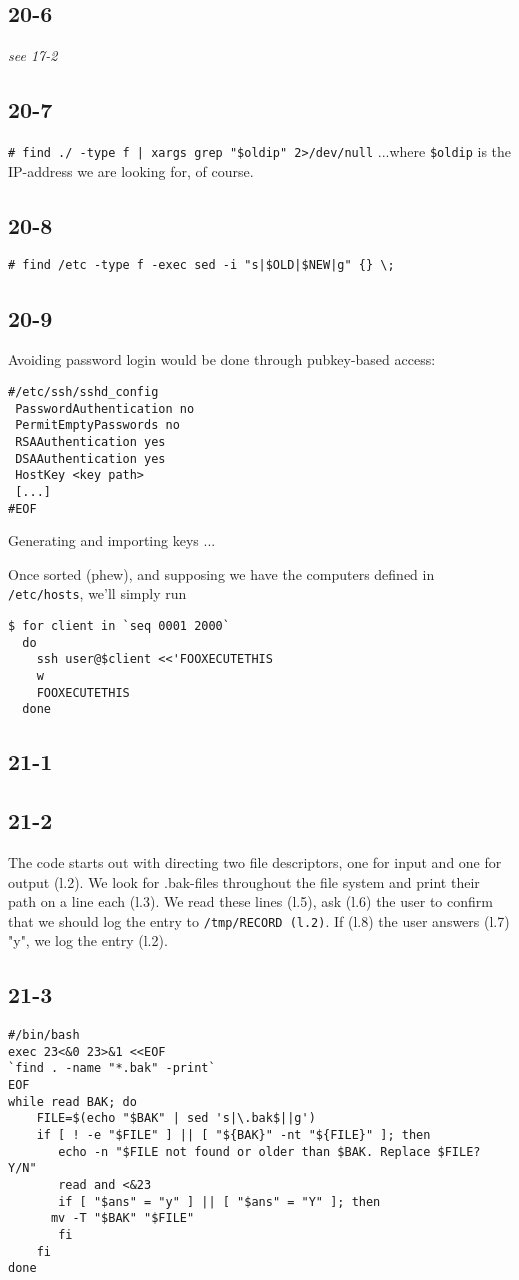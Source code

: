 \subsection{20-6}
\emph{see 17-2}

\subsection{20-7}
\verb=# find ./ -type f | xargs grep "$oldip" 2>/dev/null=
...where \verb=$oldip= is the IP-address we are looking for, of course.

\subsection{20-8}
\verb=# find /etc -type f -exec sed -i "s|$OLD|$NEW|g" {} \;=

\subsection{20-9}
Avoiding password login would be done through pubkey-based access:

\begin{verbatim}
#/etc/ssh/sshd_config
 PasswordAuthentication no
 PermitEmptyPasswords no
 RSAAuthentication yes
 DSAAuthentication yes
 HostKey <key path>
 [...]
#EOF
\end{verbatim}

Generating and importing keys ...

Once sorted (phew), and supposing we have the computers defined in \verb=/etc/hosts=,  we'll simply run

\begin{verbatim}
$ for client in `seq 0001 2000`
  do
    ssh user@$client <<'FOOXECUTETHIS
    w
    FOOXECUTETHIS
  done
\end{verbatim}
\subsection{21-1}

\subsection{21-2}
The code starts out with directing two file descriptors, one for input and one for output (l.2). We look
for .bak-files throughout the file system and print their path on a line each (l.3). We read these lines (l.5),
ask (l.6) the user to confirm that we should log the entry to \verb=/tmp/RECORD (l.2)=. If (l.8) the user answers (l.7) "y", we log the entry (l.2).

\subsection{21-3}
\begin{verbatim}
#/bin/bash
exec 23<&0 23>&1 <<EOF
`find . -name "*.bak" -print`
EOF
while read BAK; do
    FILE=$(echo "$BAK" | sed 's|\.bak$||g')
    if [ ! -e "$FILE" ] || [ "${BAK}" -nt "${FILE}" ]; then
       echo -n "$FILE not found or older than $BAK. Replace $FILE? Y/N"
       read and <&23
       if [ "$ans" = "y" ] || [ "$ans" = "Y" ]; then
	  mv -T "$BAK" "$FILE"
       fi
    fi
done
\end{verbatim}
